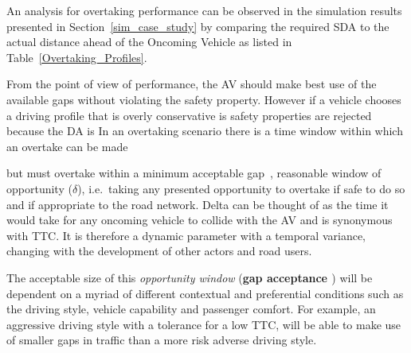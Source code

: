 An analysis for overtaking performance can be observed in the simulation results presented in Section~\ref{sim_case_study} by comparing the required SDA to the actual distance ahead of the Oncoming Vehicle as listed in Table~\ref{Overtaking_Profiles}. 

From the point of view of performance, the AV should make best use of the available gaps without violating the safety property. However if a vehicle chooses a driving profile that is overly conservative is safety properties are rejected because the DA is
In an overtaking scenario there is a time window within which an overtake can be made


%
 but must overtake 
within a minimum acceptable gap~\cite{mahmassani1981using},
reasonable window of opportunity ($\delta$), 
i.e.\ taking any presented opportunity to overtake if safe to do so and if appropriate to the road network. 
%
Delta can be thought of as the time it would take for any oncoming vehicle to collide with the AV and is synonymous with TTC. %
It is therefore a dynamic parameter with a temporal variance, changing with the development of other actors and road users.
%

%
%
The acceptable size of this \emph{opportunity window} (\textbf{gap acceptance \cite{mahmassani1981using}}) will be dependent on a myriad of different contextual and preferential conditions such as the driving style, vehicle capability and passenger comfort. For example, an aggressive driving style with a tolerance for a low TTC, will be able to make use of smaller gaps in traffic than a more risk adverse driving style. 

